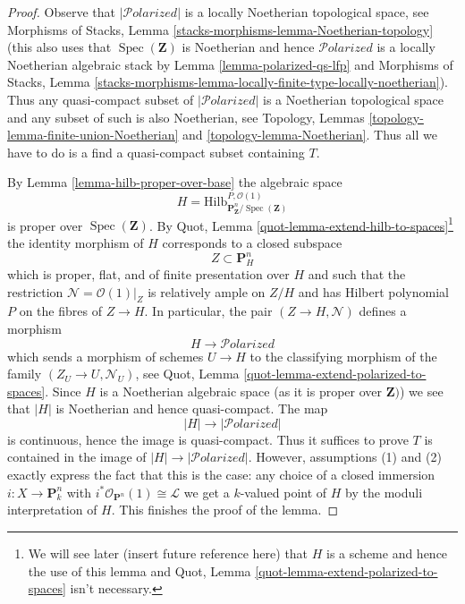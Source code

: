 \documentclass[10pt,a4paper]{amsart}
\theoremstyle{plain}
\theoremstyle{definition}
\theoremstyle{remark}
\numberwithin{equation}{subsection}
\def\Spec{\mathop{\mathrm{Spec}}}
\def\Hilbfunctor{\mathrm{Hilb}}
\def\Polarizedstack{\mathcal{P}\!\mathit{olarized}}
\begin{document}
\begin{proof}
Observe that $|\Polarizedstack|$ is a locally Noetherian topological
space, see Morphisms of Stacks, Lemma
\ref{stacks-morphisms-lemma-Noetherian-topology}
(this also uses that $\Spec(\mathbf{Z})$ is Noetherian and
hence $\Polarizedstack$ is a locally Noetherian algebraic stack
by Lemma \ref{lemma-polarized-qs-lfp} and
Morphisms of Stacks, Lemma
\ref{stacks-morphisms-lemma-locally-finite-type-locally-noetherian}).
Thus any quasi-compact subset of $|\Polarizedstack|$ is
a Noetherian topological space and any subset of such is
also Noetherian, see
Topology, Lemmas \ref{topology-lemma-finite-union-Noetherian} and
\ref{topology-lemma-Noetherian}.
Thus all we have to do is a find a quasi-compact subset
containing $T$.

\medskip\noindent
By Lemma \ref{lemma-hilb-proper-over-base} the algebraic space
$$
H =
\Hilbfunctor^{P, \mathcal{O}(1)}_{\mathbf{P}^n_\mathbf{Z}/\Spec(\mathbf{Z})}
$$
is proper over $\Spec(\mathbf{Z})$. By
Quot, Lemma \ref{quot-lemma-extend-hilb-to-spaces}\footnote{We will see
later (insert future reference here) that $H$ is a scheme and hence the
use of this lemma and Quot, Lemma \ref{quot-lemma-extend-polarized-to-spaces}
isn't necessary.} the identity morphism of $H$ corresponds
to a closed subspace
$$
Z \subset \mathbf{P}^n_H
$$
which is proper, flat, and of finite presentation over $H$ and
such that the restriction $\mathcal{N} = \mathcal{O}(1)|_Z$
is relatively ample on $Z/H$ and has Hilbert polynomial $P$
on the fibres of $Z \to H$. In particular, the pair $(Z \to H, \mathcal{N})$
defines a morphism
$$
H \longrightarrow \Polarizedstack
$$
which sends a morphism of schemes $U \to H$ to the classifying morphism
of the family $(Z_U \to U, \mathcal{N}_U)$, see
Quot, Lemma \ref{quot-lemma-extend-polarized-to-spaces}.
Since $H$ is a Noetherian algebraic space
(as it is proper over $\mathbf{Z})$)
we see that $|H|$ is Noetherian and hence quasi-compact. The map
$$
|H| \longrightarrow |\Polarizedstack|
$$
is continuous, hence the image is quasi-compact.
Thus it suffices to prove $T$ is contained
in the image of $|H| \to |\Polarizedstack|$.
However, assumptions (1) and (2) exactly express the fact
that this is the case: any choice of a closed immersion
$i : X \to \mathbf{P}^n_k$ with
$i^*\mathcal{O}_{\mathbf{P}^n}(1) \cong \mathcal{L}$ we get a
$k$-valued point of $H$ by the moduli interpretation of $H$.
This finishes the proof of the lemma.
\end{proof}
\end{document}
